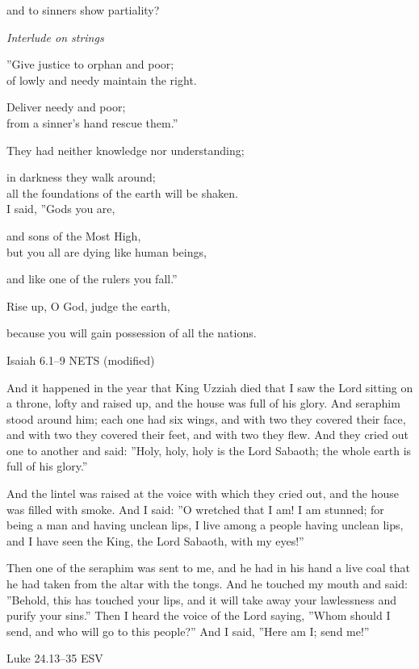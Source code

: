 \documentclass[
]{article}
\newcommand{\RL}[1]{\beginR #1\endR}
\begin{document}
and to sinners show partiality?

\emph{Interlude on strings}

\RL{''}Give justice to orphan and poor;\\
of lowly and needy maintain the right.

Deliver needy and poor;\\
from a sinner\RL{'}s hand rescue them.''

They had neither knowledge nor understanding;

in darkness they walk around;\\
all the foundations of the earth will be shaken.\\
I said, \RL{''}Gods you are,

and sons of the Most High,\\
but you all are dying like human beings,

and like one of the rulers you fall.''

Rise up, O God, judge the earth,

because you will gain possession of all the nations.

Isaiah 6.1--9 NETS (modified)

And it happened in the year that King Uzziah died that I saw the Lord
sitting on a throne, lofty and raised up, and the house was full of his
glory. And seraphim stood around him; each one had six wings, and with
two they covered their face, and with two they covered their feet, and
with two they flew. And they cried out one to another and
said:\RL{\hfill\break
''}Holy, holy, holy is the Lord Sabaoth; the whole earth is full of his
glory.''

And the lintel was raised at the voice with which they cried out, and
the house was filled with smoke. And I said: \RL{''}O wretched that I
am! I am stunned; for being a man and having unclean lips, I live among
a people having unclean lips, and I have seen the King, the Lord
Sabaoth, with my eyes!''

Then one of the seraphim was sent to me, and he had in his hand a live
coal that he had taken from the altar with the tongs. And he touched my
mouth and said: \RL{''}Behold, this has touched your lips, and it will
take away your lawlessness and purify your sins.'' Then I heard the
voice of the Lord saying, \RL{''}Whom should I send, and who will go to
this people?'' And I said, \RL{''}Here am I; send me!''

Luke 24.13--35 ESV
\end{document}

